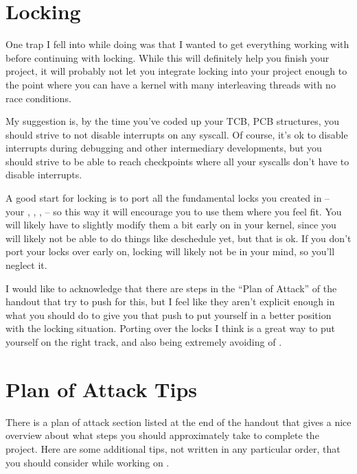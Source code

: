 \documentclass{article}
\begin{document}
\section{Locking}
\label{sec:locking}
One trap I fell into while doing  was that I wanted to get everything
working with  before continuing with locking. While
this will definitely help you finish your project, it will probably not let
you integrate locking into your project enough to the point where you can
have a kernel with many interleaving threads with no race conditions.

My suggestion is, by the time you've coded up your TCB, PCB structures, you
should strive to not disable interrupts on any syscall. Of course, it's ok to
disable interrupts during debugging and other intermediary developments, but
you should strive to be able to reach checkpoints where all your syscalls
don't have to disable interrupts.

A good start for locking is to port all the fundamental locks you created in
 -- your , , ,  -- so this way
it will encourage you to use them where you feel fit. You will likely have to
slightly modify them a bit early on in your kernel, since you will likely not
be able to do things like deschedule yet, but that is ok. If you don't port
your locks over early on, locking will likely not be in your mind, so you'll
neglect it.

I would like to acknowledge that there are steps in the ``Plan of Attack'' of
the  handout that try to push for this, but I feel like they aren't
explicit enough in what you should do to give you that push to put yourself
in a better position with the locking situation. Porting over the 
locks I think is a great way to put yourself on the right track, and also
being extremely avoiding of .

\section{Plan of Attack Tips} There is a plan of attack section listed at the
end of the handout that gives a nice overview about what steps you should
approximately take to complete the project. Here are some additional tips,
not written in any particular order, that you should consider while working
on .
\end{document}

